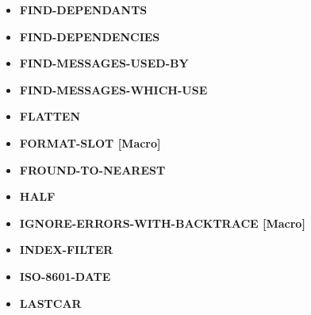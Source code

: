 \documentclass [11pt]{book}
\begin{document}
\begin{itemize}
\item {}
\textbf{FIND-DEPENDANTS}





\item {}
\textbf{FIND-DEPENDENCIES}





\item {}
\textbf{FIND-MESSAGES-USED-BY}





\item {}
\textbf{FIND-MESSAGES-WHICH-USE}





\item {}
\textbf{FLATTEN}





\item {}
\textbf{FORMAT-SLOT [Macro]}





\item {}
\textbf{FROUND-TO-NEAREST}





\item {}
\textbf{HALF}





\item {}
\textbf{IGNORE-ERRORS-WITH-BACKTRACE [Macro]}





\item {}
\textbf{INDEX-FILTER}





\item {}
\textbf{ISO-8601-DATE}





\item {}
\textbf{LASTCAR}






\end{itemize}
\end{document}
